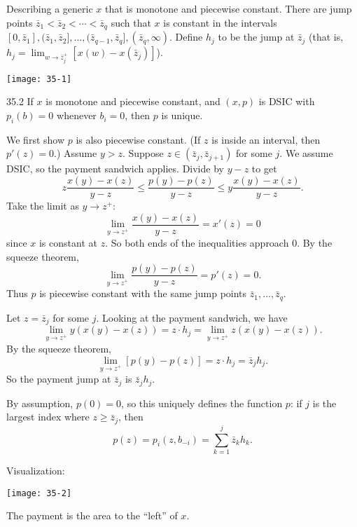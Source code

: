 \documentclass[12pt,letterpaper]{report}
\begin{document}
Describing a generic $x$ that is monotone and piecewise constant.
There are jump points $\bar{z}_1 < \bar{z}_2 < \cdots < \bar{z}_q$ such that $x$ is constant in the
intervals $[0, \bar{z}_1], (\bar{z}_1, \bar{z}_2], \ldots, (\bar{z}_{q - 1}, \bar{z}_q],
  (\bar{z}_q, \infty)$.
Define $h_j$ to be the jump at $\bar{z}_j$ (that is,
$h_j = \lim_{w \to \bar{z}_j^+} [ x(w) - x(\bar{z}_j) ]$).
\begin{center}
  \texttt{[image: 35-1]}
\end{center}

\begin{lem}{}{35.2}
  If $x$ is monotone and piecewise constant, and $(x, p)$ is DSIC with $p_i(b) = 0$ whenever
  $b_i = 0$, then $p$ is unique.
\end{lem}

\begin{thmproof}
  We first show $p$ is also piecewise constant.
  (If $z$ is inside an interval, then $p'(z) = 0$.)
  Assume $y > z$.
  Suppose $z \in (\bar{z}_j, \bar{z}_{j + 1})$ for some $j$.
  We assume DSIC, so the payment sandwich applies.
  Divide by $y - z$ to get
  \[
    z \frac{x(y) - x(z)}{y - z} \leq \frac{p(y) - p(z)}{y - z} \leq y \frac{x(y) - x(z)}{y - z}.
  \]
  Take the limit as $y \to z^+$:
  \[
    \lim_{y \to z^+} \frac{x(y) - x(z)}{y - z} = x'(z) = 0
  \]
  since $x$ is constant at $z$.
  So both ends of the inequalities approach 0.
  By the squeeze theorem,
  \[
    \lim_{y \to z^+} \frac{p(y) - p(z)}{y - z} = p'(z) = 0.
  \]
  Thus $p$ is piecewise constant with the same jump points $\bar{z}_1, \ldots, \bar{z}_q$.

  Let $z = \bar{z}_j$ for some $j$.
  Looking at the payment sandwich, we have
  \[
    \lim_{y \to z^+} y(x(y) - x(z)) = z \cdot h_j = \lim_{y \to z^+} z(x(y) - x(z)).
  \]
  By the squeeze theorem,
  \[
    \lim_{y \to z^+} [p(y) - p(z)] = z \cdot h_j = \bar{z}_j h_j.
  \]
  So the payment jump at $\bar{z}_j$ is $\bar{z}_j h_j$.

  By assumption, $p(0) = 0$, so this uniquely defines the function $p$: if $j$ is the largest index
  where $z \geq \bar{z}_j$, then
  \[
    p(z) = p_i(z, b_{-i}) = \sum_{k = 1}^j \bar{z}_k h_k.
  \]
\end{thmproof}

\pagebreak
Visualization:
\begin{center}
  \texttt{[image: 35-2]}
\end{center}
The payment is the area to the ``left'' of $x$.
\end{document}

